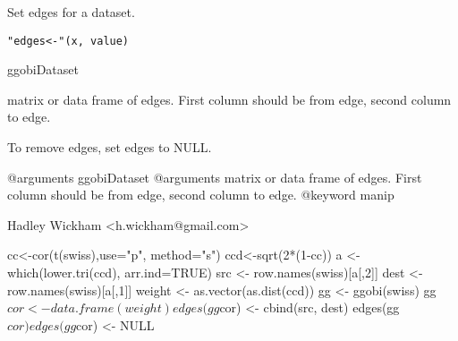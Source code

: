 \begin{Description}\relax
Set edges for a dataset.
\end{Description}
\begin{Usage}
\begin{verbatim}"edges<-"(x, value)\end{verbatim}
\end{Usage}
\begin{Arguments}
\begin{ldescription}
\item[\code{x}] ggobiDataset
\item[\code{value}] matrix or data frame of edges.  First column should be from edge, second column to edge.
\end{ldescription}
\end{Arguments}
\begin{Details}\relax
To remove edges, set edges to NULL.

@arguments ggobiDataset
@arguments matrix or data frame of edges.  First column should be from edge, second column to edge.
@keyword manip
\end{Details}
\begin{Author}\relax
Hadley Wickham <h.wickham@gmail.com>
\end{Author}
\begin{Examples}
\begin{ExampleCode}cc<-cor(t(swiss),use="p", method="s") 
ccd<-sqrt(2*(1-cc)) 
a <- which(lower.tri(ccd), arr.ind=TRUE)
src <- row.names(swiss)[a[,2]]
dest <- row.names(swiss)[a[,1]] 
weight <- as.vector(as.dist(ccd))
gg <- ggobi(swiss)
gg$cor <- data.frame(weight)
edges(gg$cor) <- cbind(src, dest)
edges(gg$cor)
edges(gg$cor) <- NULL\end{ExampleCode}
\end{Examples}

